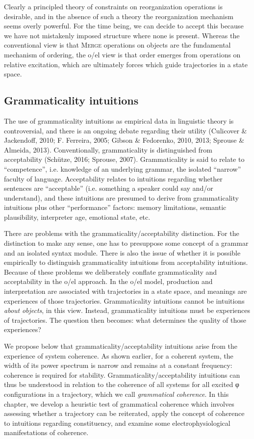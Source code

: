   Clearly a principled theory of constraints on reorganization operations is desirable, and in the absence of such a theory the reorganization mechanism seems overly powerful. For the time being, we can decide to accept this because we have not mistakenly imposed structure where none is present. Whereas the conventional view is that \textsc{Merge} operations on objects are the fundamental mechanism of ordering, the o/el view is that order emerges from operations on relative excitation, which are ultimately forces which guide trajectories in a state space.

\subsection{Grammaticality intuitions}

The use of grammaticality intuitions as empirical data in linguistic theory is controversial, and there is an ongoing debate regarding their utility (Culicover \& Jackendoff, 2010; F. Ferreira, 2005; Gibson \& Fedorenko, 2010, 2013; Sprouse \& Almeida, 2013). Conventionally, grammaticality is distinguished from acceptability (Schütze, 2016; Sprouse, 2007). Grammaticality is said to relate to “competence”, i.e. knowledge of an underlying grammar, the isolated “narrow” faculty of language. Acceptability relates to intuitions regarding whether sentences are “acceptable” (i.e. something a speaker could say and/or understand), and these intuitions are presumed to derive from grammaticality intuitions plus other “performance” factors: memory limitations, semantic plausibility, interpreter age, emotional state, etc. 

  There are problems with the grammaticality/acceptability distinction. For the distinction to make any sense, one has to presuppose some concept of a grammar and an isolated syntax module. There is also the issue of whether it is possible empirically to distinguish grammaticality intuitions from acceptability intuitions. Because of these problems we deliberately conflate grammaticality and acceptability in the o/el approach. In the o/el model, production and interpretation are associated with trajectories in a state space, and meanings are experiences of those trajectories. Grammaticality intuitions cannot be intuitions \textit{about} \textit{objects}, in this view. Instead, grammaticality intuitions must be experiences of trajectories. The question then becomes: what determines the quality of those experiences? 

  We propose below that grammaticality/acceptability intuitions arise from the experience of system coherence. As shown earlier, for a coherent system, the width of its power spectrum is narrow and remains at a constant frequency: coherence is required for stability. Grammaticality/acceptability intuitions can thus be understood in relation to the coherence of all systems for all excited φ configurations in a trajectory, which we call \textit{grammatical} \textit{coherence}. In this chapter, we develop a heuristic test of grammatical coherence which involves assessing whether a trajectory can be reiterated, apply the concept of coherence to intuitions regarding constituency, and examine some electrophysiological manifestations of coherence. 

